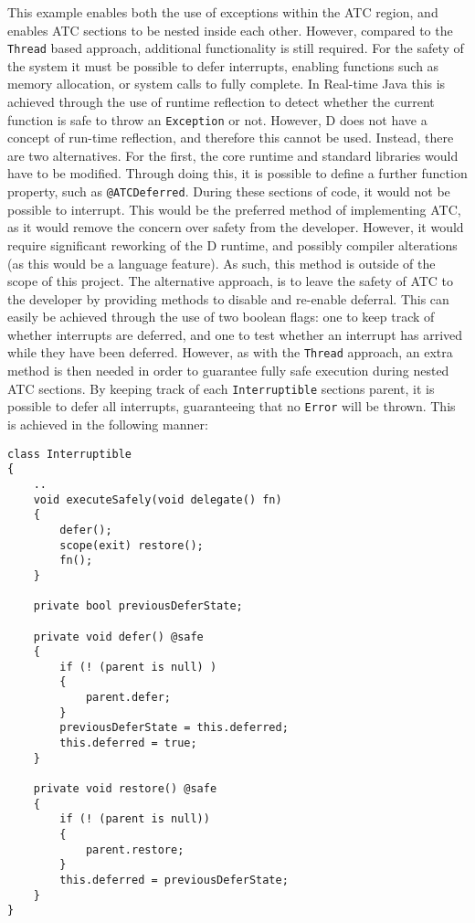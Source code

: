 This example enables both the use of exceptions within the ATC region, and
enables ATC sections to be nested inside each other. However, compared to the
\texttt{Thread} based approach, additional functionality is still required. 
For the safety of the system it must be possible to defer interrupts, enabling 
functions such as memory allocation, or system calls to fully complete. In
Real-time Java this is achieved through the use of runtime reflection to detect
whether the current function is safe to throw an \texttt{Exception} or not.
However, D does not have a concept of run-time reflection, and therefore this cannot be
used. 
Instead, there are two alternatives. For the first, the core runtime and standard
libraries would have to be modified. Through doing this, it is possible to
define a further function property, such as \texttt{@ATCDeferred}.  During these
sections of code, it would not be possible to interrupt. This
would be the preferred method of implementing ATC, as it would remove the
concern over safety from the developer. However, it would require significant
reworking of the D runtime, and possibly compiler alterations (as this would be
a language feature). As such, this method is outside of the scope of this
project. 
The alternative approach, is to leave the safety of ATC to the developer by
providing methods to disable and re-enable deferral.
This can easily be achieved through the use of two boolean flags: one to keep track
of whether interrupts are deferred, and one to test whether an interrupt has
arrived while they have been deferred. 
However, as with the \texttt{Thread} approach, an extra method is then needed in 
order to guarantee fully safe execution during nested ATC sections. By keeping
track of each \texttt{Interruptible} sections parent, it is possible to defer
all interrupts, guaranteeing that no \texttt{Error} will be thrown. This is
achieved in the following manner: 
\begin{lstlisting}
class Interruptible
{
    ..
    void executeSafely(void delegate() fn) 
    {
        defer();
        scope(exit) restore();
        fn();
    }

    private bool previousDeferState;

    private void defer() @safe
    {
        if (! (parent is null) )
        {
            parent.defer;
        }
        previousDeferState = this.deferred;
        this.deferred = true;
    }

    private void restore() @safe
    {
        if (! (parent is null))
        {
            parent.restore;
        }
        this.deferred = previousDeferState;
    }
}
\end{lstlisting}
